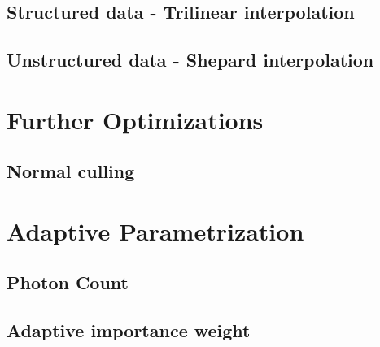 \subsection{Structured data - Trilinear interpolation}
\label{ch:trilinear}

\subsection{Unstructured data - Shepard interpolation}
\label{ch:unstructured}

\section{Further Optimizations}



\subsection{Normal culling}






\section{Adaptive Parametrization}

\subsection{Photon Count}

\subsection{Adaptive importance weight}



